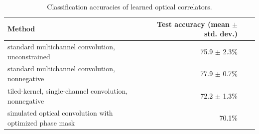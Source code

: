 \documentclass[fleqn,10pt]{wlscirepsupp}
\newcommand{\note}[1]{\textcolor{black}{#1}}
\begin{document}
\setlength{\tabcolsep}{4pt}
\begin{table} [htbp]
\begin{center}
\caption{Classification accuracies of learned optical correlators.}
\label{table:correlator}
\begin{tabular}{| l | r | r | r |} \hline 
 \textbf{Method} &  \textbf{Test accuracy (mean $\pm$ std. dev.)} \\ \hline \hline
standard multichannel convolution, unconstrained & \note{75.9 $\pm$ 2.3\%} \\
standard multichannel convolution, nonnegative & \note{77.9 $\pm$ 0.7\%} \\
tiled-kernel, single-channel convolution, nonnegative & \note{72.2 $\pm$ 1.3\%}  \\
simulated optical convolution with optimized phase mask & \note{70.1\%} \\
\hline
\end{tabular}
\end{center}
\end{table}
\setlength{\tabcolsep}{1.4pt}
\end{document}
